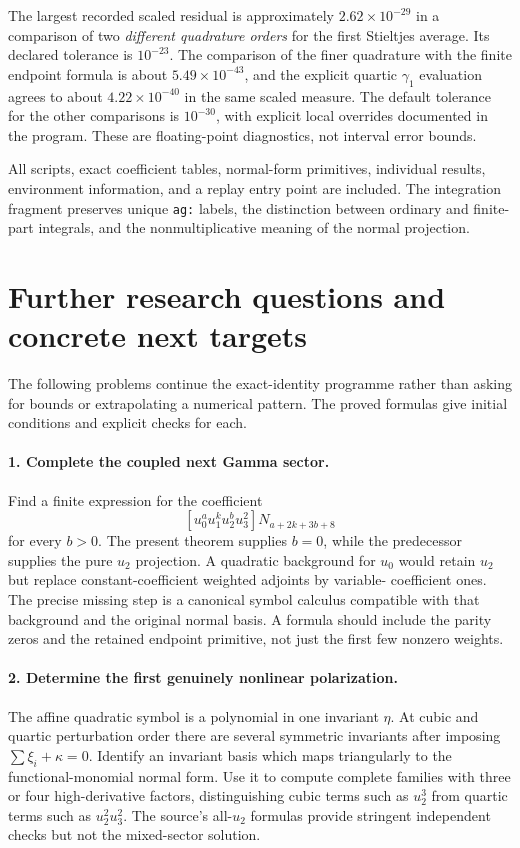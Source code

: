 \documentclass[11pt,letterpaper]{article}
\numberwithin{equation}{section}
\theoremstyle{definition}\newtheorem{definition}[theorem]{Definition}
\theoremstyle{remark}\newtheorem{remark}[theorem]{Remark}
\newcommand{\src}[1]{\nolinkurl{#1}}
\begin{document}
The largest recorded scaled residual is approximately
$2.62\times10^{-29}$ in a comparison of two \emph{different quadrature
orders} for the first Stieltjes average. Its declared tolerance is
$10^{-23}$. The comparison of the finer quadrature with the finite
endpoint formula is about $5.49\times10^{-43}$, and the explicit
quartic $\gamma_1$ evaluation agrees to about $4.22\times10^{-40}$
in the same scaled measure. The default tolerance for the other
comparisons is $10^{-30}$, with explicit local overrides documented
in the program. These are floating-point diagnostics, not interval
error bounds.

All scripts, exact coefficient tables, normal-form primitives,
individual results, environment information, and a replay entry point
are included. The integration fragment preserves unique \src{ag:}
labels, the distinction between ordinary and finite-part integrals,
and the nonmultiplicative meaning of the normal projection.



\section{Further research questions and concrete next targets}
\label{ag:sec:questions}

The following problems continue the exact-identity programme rather
than asking for bounds or extrapolating a numerical pattern. The
proved formulas give initial conditions and explicit checks for each.

\paragraph{1. Complete the coupled next Gamma sector.}
Find a finite expression for the coefficient
\[
 [u_0^a u_1^k u_2^b u_3^2]N_{a+2k+3b+8}
\]
for every $b>0$.
The present theorem supplies $b=0$, while the predecessor supplies the
pure $u_2$ projection. A quadratic background for $u_0$ would retain
$u_2$ but replace constant-coefficient weighted adjoints by variable-
coefficient ones. The precise missing step is a canonical symbol
calculus compatible with that background and the original normal basis.
A formula should include the parity zeros and the retained endpoint
primitive, not just the first few nonzero weights.

\paragraph{2. Determine the first genuinely nonlinear polarization.}
The affine quadratic symbol is a polynomial in one invariant $\eta$.
At cubic and quartic perturbation order there are several symmetric
invariants after imposing $\sum\xi_i+\kappa=0$. Identify an invariant
basis which maps triangularly to the functional-monomial normal form.
Use it to compute complete families with three or four high-derivative
factors, distinguishing cubic terms such as $u_2^3$ from quartic terms
such as $u_2^2u_3^2$. The source's all-$u_2$ formulas provide stringent
independent checks but not the mixed-sector solution.
\end{document}
